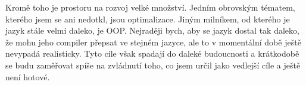 \documentclass[12pt, a4paper, titlepage, abstract=on]{scrreprt}
\begin{document}
Kromě toho je prostoru na rozvoj velké množství. Jedním obrovským tématem, kterého jsem se ani nedotkl, jsou optimalizace. Jiným milníkem, od kterého je
jazyk stále velmi daleko, je OOP. Nejraději bych, aby se jazyk dostal tak daleko, že mohu jeho compiler přepsat ve stejném jazyce, ale to v momentální
době ještě nevypadá realisticky. Tyto cíle však spadají do daleké budoucnosti a krátkodobě se budu zaměřovat spíše na zvládnutí toho, co jsem určil jako
vedlejší cíle a ještě není hotové.

\renewcommand{\bibname}{Zdroje}
\printbibliography

\end{document}
